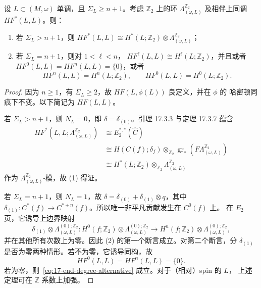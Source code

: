 \begin{theorem}[与 (Oh96b) 比较]
\label{thm:large-minimal-maslov-HF}
设 $L\subset(M,\omega)$ 单调，且 $\Sigma_L\geq n+1$。考虑 $\mathbb Z_2$ 上的\personNovikov{}环 $\Lambda_{(\omega,L)}^{\mathbb Z_2}$ 及相伴\personFloer{}上同调
$HF^*(L,L)$。则：
\begin{enumerate}[label=(\arabic*)]
\item 若 $\Sigma_L>n+1$，则
$HF^*(L,L)\cong H^*(L;\mathbb Z_2)\otimes
\Lambda_{(\omega,L)}^{\mathbb Z_2}$；
\item 若 $\Sigma_L=n+1$，则对 $1<\ell<n$，
$HF^\ell(L,L)\cong H^\ell(L;\mathbb Z_2)$，并且或者
$HF^0(L,L)=HF^n(L,L)=\{0\}$，或者
\begin{equation}
 HF^n(L,L)=H^n(L;\mathbb Z_2),
 \qquad HF^0(L,L)=H^0(L;\mathbb Z_2).
\label{eq:17-end-degree-alternative}
\end{equation}
\end{enumerate}
\end{theorem}

\begin{proof}
因为 $n\geq1$，有 $\Sigma_L\geq2$，故 $HF(L,\phi(L))$ 良定义，并在 $\phi$ 的
哈密顿同痕下不变。以下简记为 $HF(L,L)$。

若 $\Sigma_L>n+1$，则 $N_L=0$，即 $\delta=\delta_{(0)}$。引理 17.3.3 与定理
17.3.7 蕴含
\[
 \begin{aligned}
 HF^*(L,L;\Lambda_{(\omega,L)}^{\mathbb Z_2})
 &\cong E_2^{*,*}(\widehat C)\\
 &\cong H(C(f);\delta_f)\otimes_{\mathbb Z_2}
 \operatorname{gr}_*(F\Lambda_{(\omega,L)}^{\mathbb Z_2})\\
 &\cong H^*(L;\mathbb Z_2)\otimes_{\mathbb Z_2}
 \Lambda_{(\omega,L)}^{\mathbb Z_2}
 \end{aligned}
\]
作为 $\Lambda_{(\omega,L)}^{\mathbb Z_2}$-模，故 (1) 得证。

若 $\Sigma_L=n+1$，则 $N_L=1$，故
$\delta=\delta_{(0)}+\delta_{(1)}\otimes q$，其中
$\delta_{(1)}:C^*(f)\to C^{*+n}(f)$。所以唯一非平凡贡献发生在 $C^0(f)$ 上。
在 $E_2$ 页，它诱导上边界映射
\begin{equation}
 \delta_{(1)}\otimes\Lambda_{(\omega,L)}^{(0);\mathbb Z_2}:
 H^0(f;\mathbb Z_2)\otimes\Lambda_{(\omega,L)}^{(0);\mathbb Z_2}
 \longrightarrow
 H^n(f;\mathbb Z_2)\otimes\Lambda_{(\omega,L)}^{(0);\mathbb Z_2},
\label{eq:17-E2-end-degree-map}
\end{equation}
并在其他所有次数上为零。因此 (2) 的第一个断言成立。对第二个断言，分
$\delta_{(1)}$ 是否为零两种情形。若不为零，它诱导同构，故
\[
 HF^0(L,L)=HF^n(L,L)=\{0\}.
\]
若为零，则~\eqref{eq:17-end-degree-alternative} 成立。对于（相对）spin 的 $L$，
上述定理可在 $\mathbb Z$ 系数上加强。
\end{proof}

